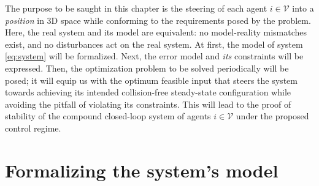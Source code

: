 The purpose to be saught in this chapter is the steering of each agent
$i \in \mathcal{V}$ into a \textit{position} in 3D space while conforming to
the requirements posed by the problem. Here, the real system and its model are
equivalent: no model-reality mismatches exist, and no disturbances act on the
real system. At first, the model of system \eqref{eq:system} will be formalized.
Next, the error model and \textit{its} constraints will be expressed. Then, the
optimization problem to be solved periodically will be posed;
it will equip us with the optimum feasible input that steers the system towards
achieving its intended collision-free steady-state configuration while avoiding
the pitfall of violating its constraints. This will lead to the proof of
stability of the compound closed-loop system of agents $i \in \mathcal{V}$
under the proposed control regime.


\section{Formalizing the system's model}

